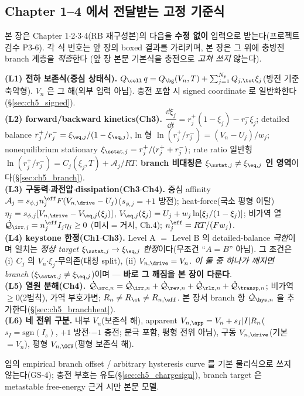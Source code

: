 \subsection{Chapter 1--4 에서 전달받는 고정 기준식}\label{sec:ch5_inherit}
본 장은 Chapter 1$\cdot$2$\cdot$3$\cdot$4(RB 재구성본)의 다음을 \textbf{수정 없이} 입력으로 받는다(프로젝트
검수 P3-6). 각 식 번호는 앞 장의 boxed 결과를 가리키며, 본 장은 그 위에 충방전 branch 계층을 \emph{적층}한다
(앞 장 본문 기본식을 충전으로 \emph{고쳐 쓰지} 않는다).
\begin{linkbox}
\textbf{(L1) 전하 보존식(중심 상태식).} $Q_\cell\,q=Q_\bg(V_n,T)+\sum_{j=1}^{N_p}Q_{j,\tot}\xi_j$(방전 기준
축약형). $V_n$ 은 그 해(외부 입력 아님). 충전 포함 시 signed coordinate 로 일반화한다(\S\ref{sec:ch5_signed}).\\
\textbf{(L2) forward/backward kinetics(Ch3).} $\dfrac{\dd\xi_j}{\dd t}=r_j^+(1-\xi_j)-r_j^-\xi_j$; detailed
balance $r_j^+/r_j^-=\xi_{\eq,j}/(1-\xi_{\eq,j})$, ln 형 $\ln(r_j^+/r_j^-)=(V_n-U_j)/w_j$; nonequilibrium
stationary $\xi_{\sstat,j}=r_j^+/(r_j^++r_j^-)$; rate ratio 일반형 $\ln(r_j^+/r_j^-)=C_j(\xi_j,T)+\mathcal A_j/RT$.
\textbf{branch 비대칭은 $\xi_{\sstat,j}\ne\xi_{\eq,j}$ 인 영역}이다(\S\ref{sec:ch5_branch}).\\
\textbf{(L3) 구동력$\cdot$과전압$\cdot$dissipation(Ch3$\cdot$Ch4).} 중심 affinity $\mathcal A_j=s_{\phi,j}n_j^{\eff}
F(V_{n,\drive}-U_j)$($s_{\phi,j}=+1$ 방전); heat-force(국소 평형 이탈) $\eta_j=s_{\phi,j}[V_{n,\drive}-V_{\eq,j}(\xi_j)]$,
$V_{\eq,j}(\xi_j)=U_j+w_j\ln[\xi_j/(1-\xi_j)]$; 비가역 열 $\dot{\mathcal Q}_{\irr,j}=n_j^{\eff}I_j\eta_j\ge0$
(미시$=$거시, Ch.4); $n_j^{\eff}=RT/(Fw_j)$.\\
\textbf{(L4) keystone 한정(Ch1$\cdot$Ch3).} Level A $=$ Level B 의 detailed-balance \emph{극한}이며 일치는
\emph{정상 target} $\xi_{\sstat,j}\to\xi_{\eq,j}$ \emph{한정}이다(무조건 ``$A=B$'' 아님). 그 조건은 (i) $C_j$
의 $V_n$$\cdot$$\xi_j$-무의존(대칭 split), (ii) $V_{n,\drive}=V_n$. \emph{이 둘 중 하나가 깨지면 branch}
($\xi_{\sstat,j}\ne\xi_{\eq,j}$)이며 — \textbf{바로 그 깨짐을 본 장이 다룬다}.\\
\textbf{(L5) 열원 분해(Ch4).} $\dot{\mathcal Q}_{\src,n}=\dot{\mathcal Q}_{\irr,n}+\dot{\mathcal Q}_{\rev,n}
+\dot{\mathcal Q}_{\rlx,n}+\dot{\mathcal Q}_{\transp,n}$; 비가역 $\ge0$(2법칙), 가역 부호가변; $R_n\ne R_\ct\ne R_{n,\eff}$.
본 장서 branch 항 $\dot{\mathcal Q}_{\hys,n}$ 을 추가한다(\S\ref{sec:ch5_branchheat}).\\
\textbf{(L6) 네 전위 구분.} 내부 $V_n$(보존식 해), apparent $V_{n,\app}=V_n+s_I|I|R_n$($s_I=\mathrm{sgn}(I_s)$,
$+1$ 방전$\cdot$$-1$ 충전; 분극 포함, 평형 전위 아님), 구동 $V_{n,\drive}$(기본 $=V_n$), 평형
$V_{n,\OCV}$(평형 보존식 해).
\end{linkbox}
임의 empirical branch offset / arbitrary hysteresis curve 를 기본 물리식으로 쓰지 않는다(GS-4); 충전 부호는
유도(\S\ref{sec:ch5_chargesign}), branch target 은 metastable free-energy 근거 시만 본문 모델.

